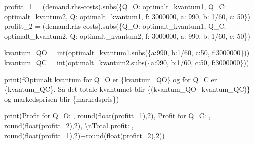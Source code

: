 \documentclass[
  12pt,
  a4paper,
  DIV=11,
  numbers=noendperiod]{scrartcl}
\newenvironment{Shaded}{\begin{snugshade}}{\end{snugshade}}
\newcommand{\BuiltInTok}[1]{\textcolor[rgb]{0.00,0.23,0.31}{#1}}
\newcommand{\CharTok}[1]{\textcolor[rgb]{0.13,0.47,0.30}{#1}}
\newcommand{\DecValTok}[1]{\textcolor[rgb]{0.68,0.00,0.00}{#1}}
\newcommand{\NormalTok}[1]{\textcolor[rgb]{0.00,0.23,0.31}{#1}}
\newcommand{\OperatorTok}[1]{\textcolor[rgb]{0.37,0.37,0.37}{#1}}
\newcommand{\SpecialCharTok}[1]{\textcolor[rgb]{0.37,0.37,0.37}{#1}}
\newcommand{\SpecialStringTok}[1]{\textcolor[rgb]{0.13,0.47,0.30}{#1}}
\newcommand{\StringTok}[1]{\textcolor[rgb]{0.13,0.47,0.30}{#1}}
\begin{document}
\begin{Shaded}
\begin{Highlighting}[]
\NormalTok{profitt\_1 }\OperatorTok{=}\NormalTok{ (demand.rhs}\OperatorTok{{-}}\NormalTok{costs).subs(\{Q\_O: optimalt\_kvantum1, Q\_C: optimalt\_kvantum2, Q: optimalt\_kvantum1, f: }\DecValTok{3000000}\NormalTok{, a: }\DecValTok{990}\NormalTok{, b: }\DecValTok{1}\OperatorTok{/}\DecValTok{60}\NormalTok{, c: }\DecValTok{50}\NormalTok{\}) }
\NormalTok{profitt\_2 }\OperatorTok{=}\NormalTok{ (demand.rhs}\OperatorTok{{-}}\NormalTok{costs).subs(\{Q\_O: optimalt\_kvantum1, Q\_C: optimalt\_kvantum2, Q: optimalt\_kvantum2, f: }\DecValTok{3000000}\NormalTok{, a: }\DecValTok{990}\NormalTok{, b: }\DecValTok{1}\OperatorTok{/}\DecValTok{60}\NormalTok{, c: }\DecValTok{50}\NormalTok{\})}



\NormalTok{kvantum\_QO }\OperatorTok{=} \BuiltInTok{int}\NormalTok{(optimalt\_kvantum1.subs(\{a:}\DecValTok{990}\NormalTok{, b:}\DecValTok{1}\OperatorTok{/}\DecValTok{60}\NormalTok{, c:}\DecValTok{50}\NormalTok{, f:}\DecValTok{3000000}\NormalTok{\}))}
\NormalTok{kvantum\_QC }\OperatorTok{=} \BuiltInTok{int}\NormalTok{(optimalt\_kvantum2.subs(\{a:}\DecValTok{990}\NormalTok{, b:}\DecValTok{1}\OperatorTok{/}\DecValTok{60}\NormalTok{, c:}\DecValTok{50}\NormalTok{, f:}\DecValTok{3000000}\NormalTok{\}))}

\BuiltInTok{print}\NormalTok{(}\SpecialStringTok{f\textquotesingle{}\textquotesingle{}\textquotesingle{}Optimalt kvantum for Q\_O er }\SpecialCharTok{\{}\NormalTok{kvantum\_QO}\SpecialCharTok{\}}\SpecialStringTok{ og for Q\_C er }\SpecialCharTok{\{}\NormalTok{kvantum\_QC}\SpecialCharTok{\}}\SpecialStringTok{. Så det totale kvantumet blir }\SpecialCharTok{\{}\NormalTok{(kvantum\_QO}\OperatorTok{+}\NormalTok{kvantum\_QC)}\SpecialCharTok{\}}\SpecialStringTok{ og markedsprisen blir }\SpecialCharTok{\{}\NormalTok{markedspris}\SpecialCharTok{\}}\SpecialStringTok{\textquotesingle{}\textquotesingle{}\textquotesingle{}}\NormalTok{)}

\BuiltInTok{print}\NormalTok{(}\StringTok{\textquotesingle{}\textquotesingle{}\textquotesingle{}Profit for Q\_O: \textquotesingle{}\textquotesingle{}\textquotesingle{}}\NormalTok{, }\BuiltInTok{round}\NormalTok{(}\BuiltInTok{float}\NormalTok{(profitt\_1),}\DecValTok{2}\NormalTok{), }\StringTok{\textquotesingle{}\textquotesingle{}\textquotesingle{}Profit for Q\_C: \textquotesingle{}\textquotesingle{}\textquotesingle{}}\NormalTok{, }\BuiltInTok{round}\NormalTok{(}\BuiltInTok{float}\NormalTok{(profitt\_2),}\DecValTok{2}\NormalTok{), }\StringTok{\textquotesingle{}\textquotesingle{}\textquotesingle{}}\CharTok{\textbackslash{}n}\StringTok{Total profit: \textquotesingle{}\textquotesingle{}\textquotesingle{}}\NormalTok{, }\BuiltInTok{round}\NormalTok{(}\BuiltInTok{float}\NormalTok{(profitt\_1),}\DecValTok{2}\NormalTok{)}\OperatorTok{+}\BuiltInTok{round}\NormalTok{(}\BuiltInTok{float}\NormalTok{(profitt\_2),}\DecValTok{2}\NormalTok{))}
\end{Highlighting}
\end{Shaded}
\end{document}
